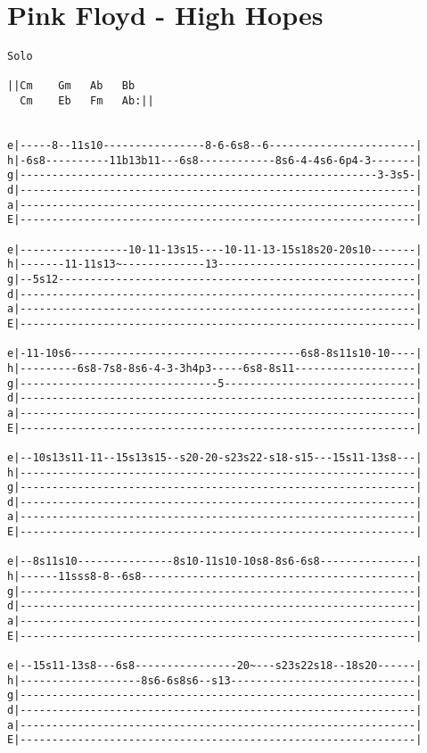 \section{Pink Floyd - High Hopes}
\begin{verbatim}
Solo

||Cm    Gm   Ab   Bb
  Cm    Eb   Fm   Ab:||


e|-----8--11s10----------------8-6-6s8--6-----------------------|
h|-6s8----------11b13b11---6s8------------8s6-4-4s6-6p4-3-------|
g|--------------------------------------------------------3-3s5-|
d|--------------------------------------------------------------|
a|--------------------------------------------------------------|
E|--------------------------------------------------------------|

e|-----------------10-11-13s15----10-11-13-15s18s20-20s10-------|
h|-------11-11s13~-------------13-------------------------------|
g|--5s12--------------------------------------------------------|
d|--------------------------------------------------------------|
a|--------------------------------------------------------------|
E|--------------------------------------------------------------|

e|-11-10s6------------------------------------6s8-8s11s10-10----|
h|---------6s8-7s8-8s6-4-3-3h4p3-----6s8-8s11-------------------|
g|-------------------------------5------------------------------|
d|--------------------------------------------------------------|
a|--------------------------------------------------------------|
E|--------------------------------------------------------------|

e|--10s13s11-11--15s13s15--s20-20-s23s22-s18-s15---15s11-13s8---|
h|--------------------------------------------------------------|
g|--------------------------------------------------------------|
d|--------------------------------------------------------------|
a|--------------------------------------------------------------|
E|--------------------------------------------------------------|

e|--8s11s10---------------8s10-11s10-10s8-8s6-6s8---------------|
h|------11sss8-8--6s8-------------------------------------------|
g|--------------------------------------------------------------|
d|--------------------------------------------------------------|
a|--------------------------------------------------------------|
E|--------------------------------------------------------------|

e|--15s11-13s8---6s8----------------20~---s23s22s18--18s20------|
h|-------------------8s6-6s8s6--s13-----------------------------|
g|--------------------------------------------------------------|
d|--------------------------------------------------------------|
a|--------------------------------------------------------------|
E|--------------------------------------------------------------|


\end{verbatim}
